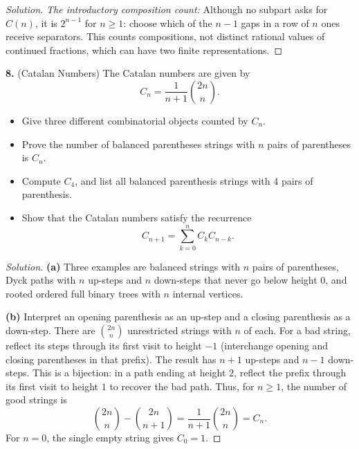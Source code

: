 \documentclass[12pt]{amsart}
\newenvironment{solution}
{\begin{proof}[Solution]}
{\end{proof}}
\begin{document}
\begin{onehalfspace}
\begin{solution}
            \emph{The introductory composition count:} Although no subpart
            asks for $C(n)$, it is $2^{n-1}$ for $n\ge1$: choose which of
            the $n-1$ gaps in a row of $n$ ones receive separators.
            This counts compositions, not distinct rational values of
            continued fractions, which can have two finite representations.
        \end{solution}

        \noindent\textbf{8.} (Catalan Numbers) The Catalan numbers are given by
        \[
            C_n = \frac{1}{n+1}\binom{2n}{n}.
        \]
        \begin{itemize}
            \item[(a)] Give three different combinatorial objects counted by $C_n$.
            \item[(b)] Prove the number of balanced parentheses strings with $n$ pairs of parentheses
            is $C_n$.
            \item[(c)] Compute $C_4$, and list all balanced parenthesis strings with 4 pairs of
            parenthesis.
            \item[(d)] Show that the Catalan numbers satisfy the recurrence
            \[
                C_{n+1} = \sum_{k=0}^n C_k C_{n-k}.
            \]
        \end{itemize}

        \begin{solution}
            \textbf{(a)} Three examples are balanced strings with $n$ pairs
            of parentheses, Dyck paths with $n$ up-steps and $n$ down-steps
            that never go below height $0$, and rooted ordered full binary
            trees with $n$ internal vertices.

            \textbf{(b)} Interpret an opening parenthesis as an up-step and
            a closing parenthesis as a down-step. There are $\binom{2n}{n}$
            unrestricted strings with $n$ of each. For a bad string, reflect
            its steps through its first visit to height $-1$ (interchange
            opening and closing parentheses in that prefix). The result
            has $n+1$ up-steps and $n-1$ down-steps. This is a bijection:
            in a path ending at height $2$, reflect the prefix through
            its first visit to height $1$ to recover the bad path.
            Thus, for $n\ge1$, the number of good strings is
            \[
                \binom{2n}{n}-\binom{2n}{n+1}
                =\frac{1}{n+1}\binom{2n}{n}=C_n.
            \]
            For $n=0$, the single empty string gives $C_0=1$.


\end{solution}
\end{onehalfspace}
\end{document}

